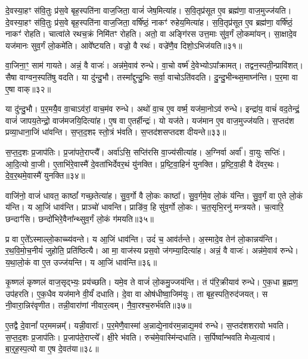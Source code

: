 दे॒वस्या॒हꣳ स॑वि॒तुः प्र॑स॒वे बृह॒स्पति॑ना वाज॒जिता॒ वाजं॑ जेष॒मित्या॑ह।
स॒वि॒तृप्र॑सूत ए॒व ब्रह्म॑णा॒ वाज॒मुज्ज॑यति।
दे॒वस्या॒हꣳ स॑वि॒तुः प्र॑स॒वे बृह॒स्पति॑ना वाज॒जिता॒ वर्\mbox{}षि॑ष्ठं॒ नाकꣳ॑ रुहेय॒मित्या॑ह।
स॒वि॒तृप्र॑सूत ए॒व ब्रह्म॑णा॒ वर्\mbox{}षि॑ष्ठं॒ नाकꣳ॑ रोहति।
चात्वा॑ले रथच॒क्रं निमि॑तꣳ रोहति।
अतो॒ वा अङ्गि॑रस उत्त॒माः सु॑व॒र्गं लो॒कमा॑यन्।
सा॒क्षादे॒व यज॑मानः सुव॒र्गं लो॒कमे॑ति।
आवे᳚ष्टयति।
वज्रो॒ वै रथः॑।
वज्रे॑णै॒व दिशो॒\-ऽभि\-ज॑यति॥३१॥\ip

वा॒जिना॒ꣳ॒ साम॑ गायते।
अन्नं॒ वै वाजः॑।
अन्न॑मे॒वाव॑ रुन्धे।
वा॒चो वर्ष्म॑ दे॒वेभ्यो\-ऽपा᳚क्रामत्।
तद्वन॒स्पती॒न्प्रावि॑शत्।
सैषा वाग्वन॒स्पति॑षु वदति।
या दु॑न्दु॒भौ।
तस्मा᳚द्दुन्दु॒भिः सर्वा॒ वाचो\-ऽति॑वदति।
दु॒न्दु॒भीन्थ्स॒माघ्न॑न्ति।
प॒र॒मा वा ए॒षा वाक्॥३२॥\ip

या दु॑न्दु॒भौ।
प॒र॒मयै॒व वा॒चा\-ऽव॑रां॒ वाच॒म॑व रुन्धे।
अथो॑ वा॒च ए॒व वर्ष्म॒ यज॑मा॒नो\-ऽव॑ रुन्धे।
इन्द्रा॑य॒ वाचं॑ वद॒तेन्द्रं॒ वाजं॑ जापय॒तेन्द्रो॒ वाज॑मजयि॒दित्या॑ह।
ए॒ष वा ए॒तर्\mbox{}हीन्द्रः॑।
यो यज॑ते।
यज॑मान ए॒व वाज॒मुज्ज॑यति।
स॒प्तद॑श प्रव्या॒धाना॒जिं धा॑वन्ति।
स॒प्त॒द॒शꣴ स्तो॒त्रं भ॑वति।
स॒प्तद॑शसप्तदश दीयन्ते॥३३॥\ip

स॒प्त॒द॒शः प्र॒जा\-प॑तिः।
प्र॒जा॑पते॒राप्त्यै᳚।
अर्वा॑ऽसि॒ सप्ति॑रसि वा॒ज्य॑सीत्या॑ह।
अ॒ग्निर्वा अर्वा᳚।
वा॒युः सप्तिः॑।
आ॒दि॒त्यो वा॒जी।
ए॒ताभि॑रे॒वास्मै॑ दे॒वता॑भिर्देवर॒थं यु॑नक्ति।
प्र॒ष्टि॒वा॒हिनं॑ युनक्ति।
प्र॒ष्टि॒वा॒ही वै दे॑वर॒थः।
दे॒व॒र॒थमे॒वास्मै॑ युनक्ति॥३४॥\ip

वाजि॑नो॒ वाजं॑ धावत॒ काष्ठां᳚ गच्छ॒तेत्या॑ह।
सु॒व॒र्गो वै लो॒कः काष्ठा᳚।
सु॒व॒र्गमे॒व लो॒कं य॑न्ति।
सु॒व॒र्गं वा ए॒ते लो॒कं य॑न्ति।
य आ॒जिं धाव॑न्ति।
प्राञ्चो॑ धावन्ति।
प्राङि॑व॒ हि सु॑व॒र्गो लो॒कः।
च॒त॒सृभि॒रनु॑\- मन्त्रयते।
च॒त्वारि॒ छन्दाꣳ॑सि।
छन्दो॑भिरे॒वैना᳚न्थ्सुव॒र्गं लो॒कं ग॑मयति॥३५॥\ip

प्र वा ए॒ते᳚\-ऽस्माल्लो॒काच्च्य॑वन्ते।
य आ॒जिं धाव॑न्ति।
उदं॑ च॒ आव॑र्तन्ते।
अ॒स्मादे॒व तेन॑ लो॒कान्नय॑न्ति।
र॒थ॒वि॒मो॒च॒नीयं॑ जुहोति॒ प्रति॑\-ष्ठित्यै।
आ मा॒ वाज॑स्य प्रस॒वो ज॑गम्या॒दित्या॑ह।
अन्नं॒ वै वाजः॑।
अन्न॑मे॒वाव॑ रुन्धे।
य॒था॒लो॒कं वा ए॒त उज्ज॑यन्ति।
य आ॒जिं धाव॑न्ति॥३६॥\ip

कृ॒ष्णलं॑ कृष्णलं वाज॒सृद्भ्यः॒ प्रय॑च्छति।
यमे॒व ते वाजं॑ लो॒कमु॒ज्जय॑न्ति।
तं प॑रि॒क्रीयाव॑ रुन्धे।
ए॒क॒धा ब्र॒ह्मण॒ उप॑हरति।
ए॒क॒धैव यज॑माने वी॒र्यं॑ दधाति।
दे॒वा वा ओष॑धीष्वा॒जिम॑युः।
ता बृह॒स्पति॒रुद॑जयत्।
स नी॒वारा॒न्निर॑वृणीत।
तन्नी॒वारा॑णां नीवार॒त्वम्।
नै॒वा॒रश्च॒रुर्भ॑वति॥३७॥\ip

ए॒तद्वै दे॒वानां᳚ पर॒ममन्नम्᳚।
यन्नी॒वाराः᳚।
प॒र॒मेणै॒वास्मा॑ अ॒न्नाद्ये॒नाव॑रम॒न्नाद्य॒मव॑ रुन्धे।
स॒प्तद॑शशरावो भवति।
स॒प्त॒द॒शः प्र॒जा\-प॑तिः।
प्र॒जा\-प॑ते॒राप्त्ये᳚।
क्षी॒रे भ॑वति।
रुच॑मे॒वास्मि॑न्दधाति।
स॒र्पिष्वा᳚न्भवति मेध्य॒त्वाय॑।
बा॒र्॒ह॒स्प॒त्यो वा ए॒ष दे॒वत॑या॥३८॥\ip

